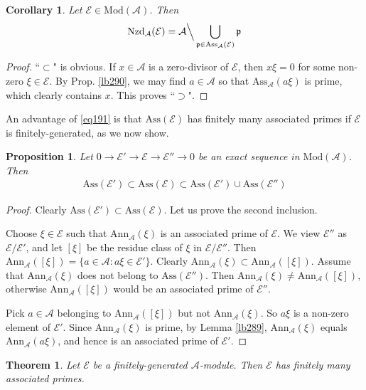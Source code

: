 \documentclass[12pt,b5paper,notitlepage]{report}
\theoremstyle{definition}
\theoremstyle{plain}
\newtheorem{thm}[df]{Theorem}
\newtheorem{pp}[df]{Proposition}
\newtheorem{co}[df]{Corollary}
\newcommand{\mc}{\mathcal}
\newcommand{\pk}{\mathfrak p}
\newcommand{\Ann}{\mathrm{Ann}}
\newcommand{\Nzd}{\mathrm{Nzd}}
\newcommand{\Mod}{\mathrm{Mod}}
\newcommand{\Ass}{\mathrm{Ass}}
\numberwithin{equation}{section}
\begin{document}
\begin{co}\label{lb294}
Let $\mc E\in\Mod(\mc A)$. Then
\begin{align}
\Nzd_{\mc A}(\mc E)=\mc A\Big\backslash\bigcup_{\pk\in\Ass_{\mc A}(\mc E)}\pk  \label{eq191}
\end{align}
\end{co}




\begin{proof}
``$\subset$" is obvious. If $x\in\mc A$ is a zero-divisor of $\mc E$, then $x\xi=0$ for some non-zero $\xi\in\mc E$. By Prop. \ref{lb290}, we may find $a\in\mc A$ so that $\Ass_{\mc A}(a\xi)$ is prime, which clearly contains $x$. This proves ``$\supset$".
\end{proof}


An advantage of \eqref{eq191} is that $\Ass(\mc E)$ has finitely many associated primes if $\mc E$ is finitely-generated, as we now show.

\begin{pp}\label{lb293}
Let $0\rightarrow\mc E'\rightarrow\mc E\rightarrow\mc E''\rightarrow0$ be an exact sequence in $\Mod(\mc A)$. Then
\begin{align*}
\Ass (\mc E')\subset\Ass(\mc E)\subset\Ass(\mc E')\cup\Ass(\mc E'')
\end{align*}
\end{pp}

\begin{proof}
Clearly $\Ass (\mc E')\subset\Ass(\mc E)$. Let us prove the second inclusion.

Choose $\xi\in\mc E$ such that $\Ann_{\mc A}(\xi)$ is an associated prime of $\mc E$. We view $\mc E''$ as $\mc E/\mc E'$, and let $[\xi]$ be the residue class of $\xi$ in $\mc E/\mc E''$. Then $\Ann_{\mc A}([\xi])=\{a\in\mc A:a\xi\in\mc E'\}$. Clearly $\Ann_{\mc A}(\xi)\subset\Ann_{\mc A}([\xi])$. Assume that $\Ann_{\mc A}(\xi)$ does not belong to $\Ass(\mc E'')$. Then $\Ann_{\mc A}(\xi)\neq\Ann_{\mc A}([\xi])$, otherwise $\Ann_{\mc A}([\xi])$ would be an associated prime of $\mc E''$. 

Pick $a\in\mc A$ belonging to $\Ann_{\mc A}([\xi])$ but not $\Ann_{\mc A}(\xi)$. So $a\xi$ is a non-zero element of $\mc E'$. Since $\Ann_{\mc A}(\xi)$ is prime, by Lemma \ref{lb289}, $\Ann_{\mc A}(\xi)$ equals $\Ann_{\mc A}(a\xi)$, and hence is an associated prime of $\mc E'$.
\end{proof}


\begin{thm}\label{lb295}
Let $\mc E$ be a finitely-generated $\mc A$-module. Then $\mc E$ has finitely many associated primes.
\end{thm}
\end{document}
